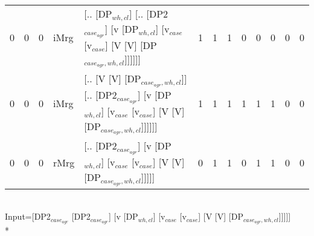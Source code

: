 \begin{tabularx}{\linewidth}{rrrlXrrrrrrrr}
   0 &       0 &   0 & iMrg & [.. [DP$_{wh,cl}$] [.. [DP2$_{case_{agr}}$] [v [DP$_{wh,cl}$] [v$_{case}$ [v$_{case}$] [V [V] [DP$_{case_{agr},wh,cl}$]]]]]]                                                   &            1 &             1 &             1 &                  0 &           0 &           0 &             0 &            0 \\
   0 &       0 &   0 & iMrg & [.. [V [V] [DP$_{case_{agr},wh,cl}$]] [.. [DP2$_{case_{agr}}$] [v [DP$_{wh,cl}$] [v$_{case}$ [v$_{case}$] [V [V] [DP$_{case_{agr},wh,cl}$]]]]]]                                  &            1 &             1 &             1 &                  1 &           1 &           1 &             0 &            0 \\
   0 &       0 &   0 & rMrg & [.. [DP2$_{case_{agr}}$] [v [DP$_{wh,cl}$] [v$_{case}$ [v$_{case}$] [V [V] [DP$_{case_{agr},wh,cl}$]]]]]                                                                   &            0 &             1 &             1 &                  0 &           1 &           1 &             0 &            0 \\
\hline
\end{tabularx}\endgroup\\
\begingroup\scriptsize Input=[DP2$_{case_{agr}}$ [DP2$_{case_{agr}}$] [v [DP$_{wh,cl}$] [v$_{case}$ [v$_{case}$] [V [V] [DP$_{case_{agr},wh,cl}$]]]]]\\*
